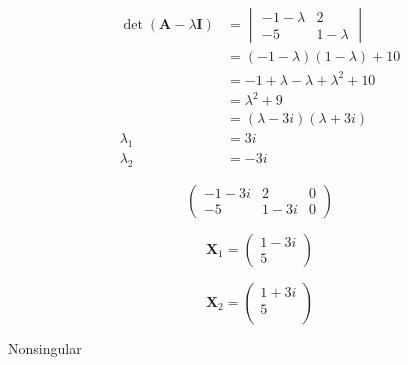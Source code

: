 \documentclass{article}
\begin{document}
\begin{align*}
  \det (\mathbf{A} - \lambda \mathbf{I}) & = \begin{vmatrix}
                                               -1 - \lambda & 2           \\
                                               -5           & 1 - \lambda
                                             \end{vmatrix}              \\
                                         & = (-1 - \lambda) (1 - \lambda) + 10       \\
                                         & = -1 + \lambda - \lambda + \lambda^2 + 10 \\
                                         & = \lambda^2 + 9                           \\
                                         & = (\lambda - 3 i) (\lambda + 3 i)         \\
  \lambda_1                              & = 3 i                                     \\
  \lambda_2                              & = -3 i
\end{align*}

\[\left( \begin{array}{cc|c}
      -1 - 3 i & 2       & 0 \\
      -5       & 1 - 3 i & 0
    \end{array} \right)\]

\[\mathbf{X}_1 = \begin{pmatrix}
    1 - 3 i \\
    5
  \end{pmatrix}\]

\[\mathbf{X}_2 = \begin{pmatrix}
    1 + 3 i \\
    5       \\
  \end{pmatrix}\]

Nonsingular

\setcounter{subsubsection}{22}
\subsubsection{}
\end{document}
